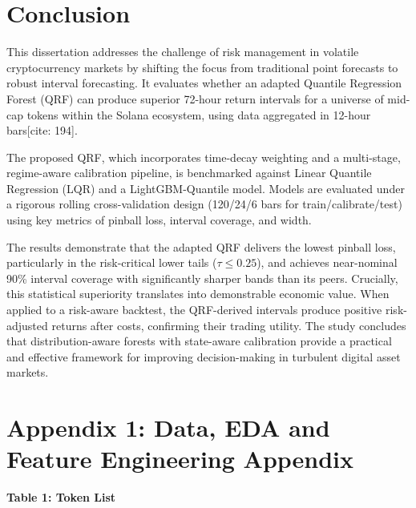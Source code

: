 \documentclass[
  a4paper,
  DIV=11,
  numbers=noendperiod]{scrreprt}
\begin{document}
\chapter{Conclusion}\label{sec-conclusion}

This dissertation addresses the challenge of risk management in volatile
cryptocurrency markets by shifting the focus from traditional point
forecasts to robust interval forecasting. It evaluates whether an
adapted Quantile Regression Forest (QRF) can produce superior 72-hour
return intervals for a universe of mid-cap tokens within the Solana
ecosystem, using data aggregated in 12-hour bars{[}cite: 194{]}.

The proposed QRF, which incorporates time-decay weighting and a
multi-stage, regime-aware calibration pipeline, is benchmarked against
Linear Quantile Regression (LQR) and a LightGBM-Quantile model. Models
are evaluated under a rigorous rolling cross-validation design (120/24/6
bars for train/calibrate/test) using key metrics of pinball loss,
interval coverage, and width.

The results demonstrate that the adapted QRF delivers the lowest pinball
loss, particularly in the risk-critical lower tails (\(\tau \le 0.25\)),
and achieves near-nominal 90\% interval coverage with significantly
sharper bands than its peers. Crucially, this statistical superiority
translates into demonstrable economic value. When applied to a
risk-aware backtest, the QRF-derived intervals produce positive
risk-adjusted returns after costs, confirming their trading utility. The
study concludes that distribution-aware forests with state-aware
calibration provide a practical and effective framework for improving
decision-making in turbulent digital asset markets.

\cleardoublepage
{}
{}
\appendix

\chapter{Appendix 1: Data, EDA and Feature Engineering
Appendix}\label{appendix-1-data-eda-and-feature-engineering-appendix}

\textbf{Table 1: Token List}
\end{document}
